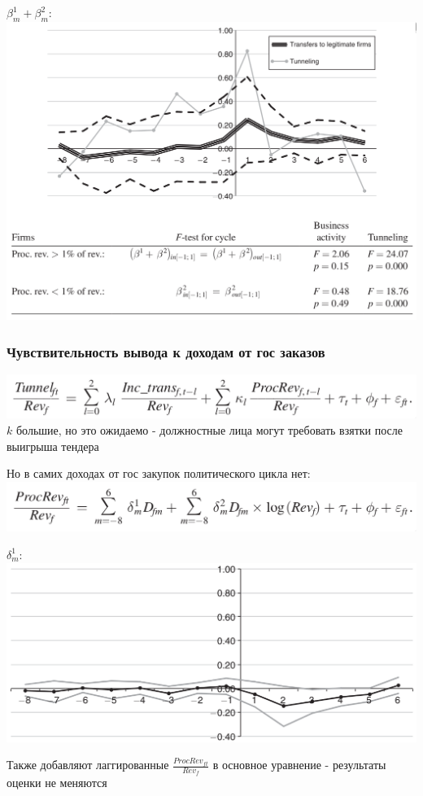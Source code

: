 \begin{frame}
$\beta^1_m + \beta^2_m$:
\includegraphics[scale=0.25]{images/legit_trans}
\end{frame}

\begin{frame}
\frametitle{Чувствительность вывода к доходам от гос заказов}
\includegraphics[scale=0.3]{images/tunnelling_from_procurement}
$k$ большие, но это ожидаемо - должностные лица могут требовать взятки после выигрыша тендера
\end{frame}

\begin{frame}
Но в самих доходах от гос закупок политического цикла нет:
\includegraphics[scale=0.3]{images/tunnelling_from_procurement2}\\
\vspace{3mm}

$\delta^1_m$:\\
\includegraphics[scale=0.25]{images/tunnelling_from_procurement3}
\vspace{3mm}

Также добавляют лаггированные $\frac{ProcRev_{ft}}{Rev_f}$ в основное уравнение - результаты оценки не меняются
\end{frame}